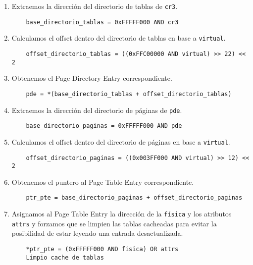 \begin{enumerate}
	\item Extraemos la dirección del directorio de tablas de \texttt{cr3}.
	\begin{lstlisting}
	base_directorio_tablas = 0xFFFFF000 AND cr3
	\end{lstlisting}

	\item Calculamos el offset dentro del directorio de tablas en base a \texttt{virtual}.
	\begin{lstlisting}
	offset_directorio_tablas = ((0xFFC00000 AND virtual) >> 22) << 2
	\end{lstlisting}

	\item Obtenemos el Page Directory Entry correspondiente.\label{mapping_step3}
	\begin{lstlisting}
	pde = *(base_directorio_tablas + offset_directorio_tablas)
	\end{lstlisting}

	\item Extraemos la dirección del directorio de páginas de \texttt{pde}.
	\begin{lstlisting}
	base_directorio_paginas = 0xFFFFF000 AND pde
	\end{lstlisting}

	\item Calculamos el offset dentro del directorio de páginas en base a
	\texttt{virtual}.
	\begin{lstlisting}
	offset_directorio_paginas = ((0x003FF000 AND virtual) >> 12) << 2
	\end{lstlisting}

	\item Obtenemos el puntero al Page Table Entry correspondiente.
	\begin{lstlisting}
	ptr_pte = base_directorio_paginas + offset_directorio_paginas
	\end{lstlisting}

	\item Asignamos al Page Table Entry la dirección de la \texttt{física} y los
	atributos \texttt{attrs} y forzamos que se limpien las tablas cacheadas para
	evitar la posibilidad de estar leyendo una entrada desactualizada.
	\begin{lstlisting}
	*ptr_pte = (0xFFFFF000 AND fisica) OR attrs
	Limpio cache de tablas
	\end{lstlisting}
\end{enumerate}

